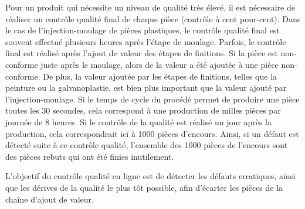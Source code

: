 
Pour un produit qui nécessite un niveau de qualité très élevé, il est nécessaire de réaliser un contrôle qualité final de chaque pièce (contrôle à cent pour-cent).
Dans le cas de l'injection-moulage de pièces plastiques, le contrôle qualité final est souvent effectué plusieurs heures après l’étape de moulage.
Parfois, le contrôle final est réalisé après l’ajout de valeur des étapes de finitions.  %
Si la pièce est non-conforme juste après le moulage, alors de la valeur a été ajoutée à une pièce non-conforme.
De plus, la valeur ajoutée par les étapes de finitions, telles que la peinture ou la galvanoplastie, est bien plus important que la valeur ajouté par l'injection-moulage.
Si le temps de cycle du procédé permet de produire une pièce toutes les 30 secondes, cela correspond à une production de milles pièces par journée de 8 heures.
Si le contrôle de la qualité est réalisé un jour après la production, cela correspondrait ici à 1000 pièces d'encours.
Ainsi, si un défaut est détecté suite à ce contrôle qualité, l'ensemble des 1000 pièces de l'encours sont des pièces rebuts qui ont été finies inutilement.

L’objectif du contrôle qualité en ligne est de détecter les défauts erratiques, ainsi que les dérives de la qualité le plus tôt possible, afin d'écarter les pièces de la chaîne d'ajout de valeur.

